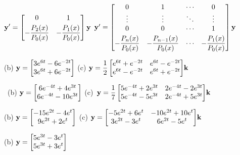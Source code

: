 
$\displaystyle{\mathbf{y}'=\begin{bmatrix}0&1\\[\jot]
-\dfrac{P_2(x)}{P_0(x)}&-\dfrac{P_1(x)}{P_0(x)}\end{bmatrix}\mathbf{y}}$
\quad
{}
$\mathbf{y}'=\begin{bmatrix}
0&1&\cdots&0\\ \vdots&\vdots&\ddots&\vdots\\0&0&\cdots&1\\[\jot]
-\dfrac{P_n(x)}{P_0(x)}&-\dfrac{P_{n-1}(x)}{P_0(x)}&\cdots&
-\dfrac{P_1(x)}{P_0(x)}\end{bmatrix}\mathbf{y}$

\smallskip

(b)\;
$\mathbf{y}=\displaystyle{\begin{bmatrix}3e^{6t}-6e^{-2t}\\3e^{6t}+6e^{-2t}
\end{bmatrix}}$ \quad
(c)\;
$\mathbf{y}=
\displaystyle{\frac{1}{2}\begin{bmatrix}e^{6t}+e^{-2t}&e^{6t}-e^{-2t}
\\e^{6t}-e^{-2t}&e^{6t}+e^{-2t}\end{bmatrix}}\mathbf{k}$

\bigskip

\,
(b)
$\mathbf{y}=\displaystyle{\begin{bmatrix}6e^{-4t}+4e^{3t}\\6e^{-4t}-10e^{3t}
\end{bmatrix}}$\quad\;
(c)\, $\mathbf{y}=
\displaystyle{\frac{1}{7}\begin{bmatrix}5e^{-4t}+2e^{3t}&2e^{-4t}-2e^{3t}
\\5e^{-4t}-5e^{3t}&2e^{-4t}+5e^{3t}\end{bmatrix}}\mathbf{k}$
\medskip

(b)
$\mathbf{y}=\displaystyle{\begin{bmatrix}-15e^{2t}-4e^t\\9e^{2t}+2e^t
\end{bmatrix}}$
\qquad(c) $\mathbf{y}=\displaystyle{\begin{bmatrix}
-5e^{2t}+6e^t&-10e^{2t}+10e^t\\
3e^{2t}-3e^t&6e^{2t}-5e^t\end{bmatrix}}\mathbf{k}$

\medskip

(b) $\mathbf{y}=\displaystyle{\begin{bmatrix}5e^{3t}-3e^t\\5e^{3t}+3e^t
\end{bmatrix}}$  \qquad\; \;
